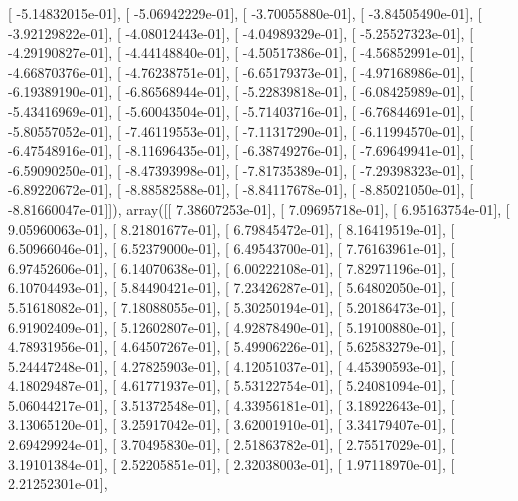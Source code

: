 \documentclass{article}
\begin{document}
       [ -5.14832015e-01],
       [ -5.06942229e-01],
       [ -3.70055880e-01],
       [ -3.84505490e-01],
       [ -3.92129822e-01],
       [ -4.08012443e-01],
       [ -4.04989329e-01],
       [ -5.25527323e-01],
       [ -4.29190827e-01],
       [ -4.44148840e-01],
       [ -4.50517386e-01],
       [ -4.56852991e-01],
       [ -4.66870376e-01],
       [ -4.76238751e-01],
       [ -6.65179373e-01],
       [ -4.97168986e-01],
       [ -6.19389190e-01],
       [ -6.86568944e-01],
       [ -5.22839818e-01],
       [ -6.08425989e-01],
       [ -5.43416969e-01],
       [ -5.60043504e-01],
       [ -5.71403716e-01],
       [ -6.76844691e-01],
       [ -5.80557052e-01],
       [ -7.46119553e-01],
       [ -7.11317290e-01],
       [ -6.11994570e-01],
       [ -6.47548916e-01],
       [ -8.11696435e-01],
       [ -6.38749276e-01],
       [ -7.69649941e-01],
       [ -6.59090250e-01],
       [ -8.47393998e-01],
       [ -7.81735389e-01],
       [ -7.29398323e-01],
       [ -6.89220672e-01],
       [ -8.88582588e-01],
       [ -8.84117678e-01],
       [ -8.85021050e-01],
       [ -8.81660047e-01]]), array([[  7.38607253e-01],
       [  7.09695718e-01],
       [  6.95163754e-01],
       [  9.05960063e-01],
       [  8.21801677e-01],
       [  6.79845472e-01],
       [  8.16419519e-01],
       [  6.50966046e-01],
       [  6.52379000e-01],
       [  6.49543700e-01],
       [  7.76163961e-01],
       [  6.97452606e-01],
       [  6.14070638e-01],
       [  6.00222108e-01],
       [  7.82971196e-01],
       [  6.10704493e-01],
       [  5.84490421e-01],
       [  7.23426287e-01],
       [  5.64802050e-01],
       [  5.51618082e-01],
       [  7.18088055e-01],
       [  5.30250194e-01],
       [  5.20186473e-01],
       [  6.91902409e-01],
       [  5.12602807e-01],
       [  4.92878490e-01],
       [  5.19100880e-01],
       [  4.78931956e-01],
       [  4.64507267e-01],
       [  5.49906226e-01],
       [  5.62583279e-01],
       [  5.24447248e-01],
       [  4.27825903e-01],
       [  4.12051037e-01],
       [  4.45390593e-01],
       [  4.18029487e-01],
       [  4.61771937e-01],
       [  5.53122754e-01],
       [  5.24081094e-01],
       [  5.06044217e-01],
       [  3.51372548e-01],
       [  4.33956181e-01],
       [  3.18922643e-01],
       [  3.13065120e-01],
       [  3.25917042e-01],
       [  3.62001910e-01],
       [  3.34179407e-01],
       [  2.69429924e-01],
       [  3.70495830e-01],
       [  2.51863782e-01],
       [  2.75517029e-01],
       [  3.19101384e-01],
       [  2.52205851e-01],
       [  2.32038003e-01],
       [  1.97118970e-01],
       [  2.21252301e-01],
\end{document}
